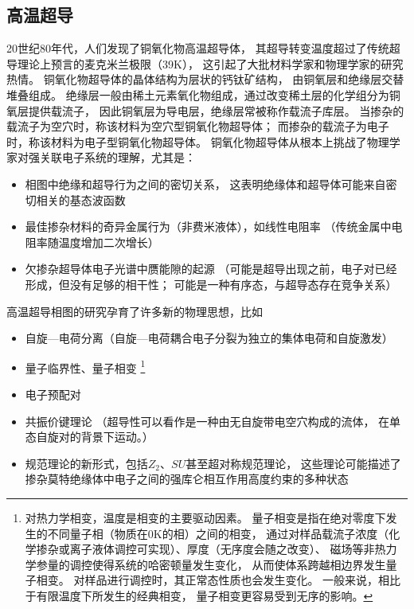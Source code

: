 \documentclass{article}
\begin{document}
\subsection{高温超导}
20世纪80年代，人们发现了铜氧化物高温超导体，
其超导转变温度超过了传统超导理论上预言的麦克米兰极限（39K），
这引起了大批材料学家和物理学家的研究热情。
铜氧化物超导体的晶体结构为层状的钙钛矿结构，
由铜氧层和绝缘层交替堆叠组成。
绝缘层一般由稀土元素氧化物组成，通过改变稀土层的化学组分为铜氧层提供载流子，
因此铜氧层为导电层，绝缘层常被称作载流子库层。
当掺杂的载流子为空穴时，称该材料为空穴型铜氧化物超导体；
而掺杂的载流子为电子时，称该材料为电子型铜氧化物超导体。
铜氧化物超导体从根本上挑战了物理学家对强关联电子系统的理解，尤其是：
\begin{itemize}
    \item 相图中绝缘和超导行为之间的密切关系，
    这表明绝缘体和超导体可能来自密切相关的基态波函数
    \item 最佳掺杂材料的奇异金属行为（非费米液体），如线性电阻率
    （传统金属中电阻率随温度增加二次增长）
    \item 欠掺杂超导体电子光谱中赝能隙的起源
    （可能是超导出现之前，电子对已经形成，但没有足够的相干性；
    可能是一种有序态，与超导态存在竞争关系）
 \end{itemize}

 高温超导相图的研究孕育了许多新的物理思想，比如
 \begin{itemize}
     \item 自旋---电荷分离（自旋---电荷耦合电子分裂为独立的集体电荷和自旋激发）
     \item 量子临界性、量子相变
     \footnote{
        对热力学相变，温度是相变的主要驱动因素。
        量子相变是指在绝对零度下发生的不同量子相（物质在0K的相）之间的相变，
        通过对样品载流子浓度（化学掺杂或离子液体调控可实现）、厚度（无序度会随之改变）、
        磁场等非热力学参量的调控使得系统的哈密顿量发生变化，
        从而使体系跨越相边界发生量子相变。
        对样品进行调控时，其正常态性质也会发生变化。
        一般来说，相比于有限温度下所发生的经典相变，
        量子相变更容易受到无序的影响。
     }
     \item 电子预配对
     \item 共振价键理论
     （超导性可以看作是一种由无自旋带电空穴构成的流体，
     在单态自旋对的背景下运动。）
     \item 规范理论的新形式，包括$Z_2$、$SU$甚至超对称规范理论，
     这些理论可能描述了掺杂莫特绝缘体中电子之间的强库仑相互作用高度约束的多种状态
 \end{itemize}
\end{document}
